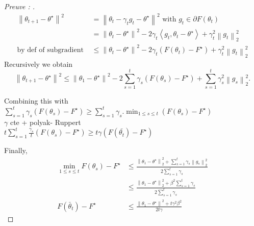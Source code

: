 \begin{proof}[Preuve : ]
    \begin{align*}
        \left\| \theta _{t + 1} - \theta ^\star  \right\| ^2 
            &= \left\| \theta _t - \gamma _t g_t - \theta ^\star  \right\| ^2 \text{ with } g_t \in \partial F(\theta _t) \\
            &= \left\| \theta _t - \theta ^\star  \right\| ^2 - 2 \gamma _t \left\langle g_t , \theta _t - \theta ^\star \right\rangle + \gamma _t ^2 \left\| g_t \right\| _2 ^2 \\
            \text{by def of subgradient } &\leq \left\| \theta _t - \theta ^\star  \right\| ^2 - 2 \gamma _t (F(\theta _t) - F^\star ) + \gamma _t ^2 \left\| g_t \right\| _2 ^2 
    \end{align*}
    Recursively we obtain 
    \[
        \left\| \theta _{t+1} - \theta ^\star  \right\| ^2 \leq  \left\| \theta _1 - \theta ^\star  \right\| ^2 - 2 \sum_{s=1}^{t} \gamma _s (F(\theta _s) - F^\star ) + \sum_{s=1}^{t} \gamma _s ^2 \left\| g_s \right\| _2 ^2 
    .\]
    
    Combining this with $\sum_{s=1}^t \gamma _s (F(\theta _s) - F^{\star }) \geq \sum_{s=1}^t \gamma_s. \min_{1 \leq s \leq t} (F(\theta _s) - F^{\star })$ \\
    $\gamma$ cte + polyak- Ruppert \\
    $t \sum_{s=1}^t \frac{\gamma_s}{t}(F(\theta _s) - F^{\star }) \geq t \gamma (F(\bar{\theta _t}) - F^{\star })$ 


    Finally, 
    \begin{align*}
        \min _{1 \leq s \leq t} F (\theta _s) - F^\star 
        &\leq \frac{\left\| \theta _1 - \theta ^\star  \right\|_2 ^2 + \sum_{s=1}^{t} \gamma _s \left\| g_s \right\|_2 ^2  }{2 \sum_{s=1}^{t} \gamma _s} \\
        &\leq \frac{\left\| \theta _1 - \theta ^\star  \right\|_2 ^2 + \beta ^2 \sum_{s=1}^{t} \gamma _s  }{2 \sum_{s=1}^{t} \gamma _s} \\
        F(\bar{\theta}_t) - F^\star &\leq \frac{\left\| \theta _1 - \theta ^\star  \right\| ^2 + t \gamma ^2 \beta ^2}{2t \gamma}
    \end{align*}
\end{proof}


